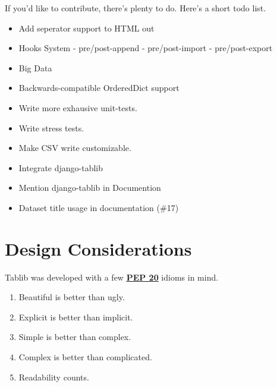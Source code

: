 \documentclass[a4paper,12pt,english]{sphinxmanual}
\begin{document}
If you'd like to contribute, there's plenty to do. Here's a short todo list.
\begin{itemize}
\item {} 
Add seperator support to HTML out

\item {} 
Hooks System
- pre/post-append
- pre/post-import
- pre/post-export

\item {} 
Big Data

\item {} 
Backwards-compatible OrderedDict support

\item {} 
Write more exhausive unit-tests.

\item {} 
Write stress tests.

\item {} 
Make CSV write customizable.

\item {} 
Integrate django-tablib

\item {} 
Mention django-tablib in Documention

\item {} 
Dataset title usage in documentation (\#17)

\end{itemize}


\section{Design Considerations}
\label{development:design}\label{development:design-considerations}
Tablib was developed with a few \href{http://www.python.org/dev/peps/pep-0020}{\textbf{PEP 20}} idioms in mind.
\begin{enumerate}
\item {} 
Beautiful is better than ugly.

\item {} 
Explicit is better than implicit.

\item {} 
Simple is better than complex.

\item {} 
Complex is better than complicated.

\item {} 
Readability counts.

\end{enumerate}
\end{document}
